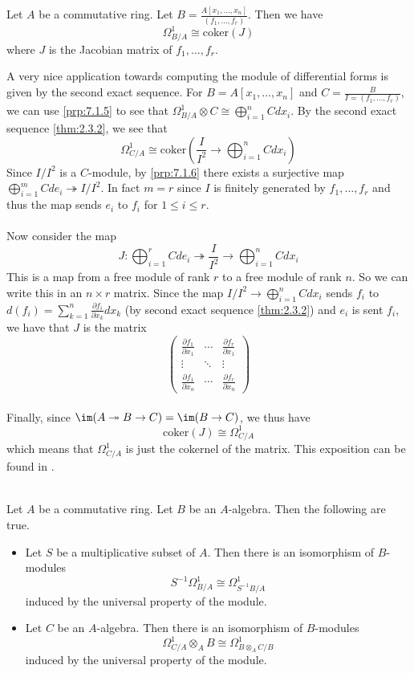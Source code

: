 \documentclass[a4paper]{article}
\begin{document}
\begin{eg}{}{} Let $A$ be a commutative ring. Let $B=\frac{A[x_1,\dots,x_n]}{(f_1,\dots,f_r)}$. Then we have $$\Omega_{B/A}^1\cong\text{coker}(J)$$ where $J$ is the Jacobian matrix of $f_1,\dots,f_r$. 
\end{eg}

A very nice application towards computing the module of differential forms is given by the second exact sequence. For $B=A[x_1,\dots,x_n]$ and $C=\frac{B}{I=(f_1,\dots,f_r)}$, we can use \ref{prp:7.1.5} to see that $\Omega_{B/A}^1\otimes C\cong\bigoplus_{i=1}^nCdx_i$. By the second exact sequence \ref{thm:2.3.2}, we see that $$\Omega_{C/A}^1\cong\text{coker}\left(\frac{I}{I^2}\to\bigoplus_{i=1}^nCdx_i\right)$$ Since $I/I^2$ is a $C$-module, by \ref{prp:7.1.6} there exists a surjective map $\bigoplus_{i=1}^mCde_i\twoheadrightarrow I/I^2$. In fact $m=r$ since $I$ is finitely generated by $f_1,\dots,f_r$ and thus the map sends $e_i$ to $f_i$ for $1\leq i\leq r$. \\~\\

Now consider the map $$J:\bigoplus_{i=1}^rCde_i\twoheadrightarrow\frac{I}{I^2}\rightarrow\bigoplus_{i=1}^nCdx_i$$ This is a map from a free module of rank $r$ to a free module of rank $n$. So we can write this in an $n\times r$ matrix. Since the map $I/I^2\to\bigoplus_{i=1}^nCdx_i$ sends $f_i$ to $d(f_i)=\sum_{k=1}^n\frac{\partial f_i}{\partial x_k}dx_k$ (by second exact sequence \ref{thm:2.3.2}) and $e_i$ is sent $f_i$, we have that $J$ is the matrix $$\begin{pmatrix}
\frac{\partial f_1}{\partial x_1} & \cdots & \frac{\partial f_r}{\partial x_1}\\
\vdots & \ddots & \vdots\\
\frac{\partial f_1}{\partial x_n} & \cdots & \frac{\partial f_r}{\partial x_n}
\end{pmatrix}$$~\\

Finally, since $\im(A\twoheadrightarrow B\to C)=\im(B\to C)$, we thus have $$\text{coker}(J)\cong\Omega_{C/A}^1$$ which means that $\Omega_{C/A}^1$ is just the cokernel of the matrix. This exposition can be found in \cite{Dav}. 

\begin{prp}{}{}\\
Let $A$ be a commutative ring. Let $B$ be an $A$-algebra. Then the following are true. 
\begin{itemize}
\item Let $S$ be a multiplicative subset of $A$. Then there is an isomorphism of $B$-modules $$S^{-1}\Omega_{B/A}^1\cong\Omega_{S^{-1}B/A}^1$$ induced by the universal property of the module. 
\item Let $C$ be an $A$-algebra. Then there is an isomorphism of $B$-modules $$\Omega_{C/A}^1\otimes_AB\cong\Omega_{B\otimes_AC/B}^1$$ induced by the universal property of the module. 
\end{itemize}
\end{prp}
\end{document}

